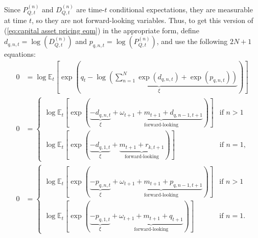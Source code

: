 \documentclass[12 pt, oneside]{article}
\theoremstyle{definition}
\theoremstyle{definition}
\theoremstyle{definition}
\newcommand{\E}{\mathbb{E}}
\begin{document}
Since $P_{Q, t}^{(n)}$ and $D_{Q, t}^{(n)}$ are time-$t$ conditional expectations, they are measurable at time $t$, so they are not forward-looking variables. Thus, to get this version of (\ref{eq:capital asset pricing eqm}) in the appropriate form, define $d_{q, n, t} = \log(D_{Q, t}^{(n)})$ and $p_{q, n, t} = \log(P_{Q, t}^{(n)})$, and use the following $2N + 1$ equations:
\begin{align}
  0 & = \log\E_t\left[\exp\left(\underbrace{q_t - \log\left(\sum_{n = 1}^{N}\exp(d_{q, n, t}) + \exp(p_{q, n, t})\right)}_{\xi}\right)\right]\\
  0 & =
      \begin{cases}
        \log\E_t\left[\exp\left(\underbrace{-d_{q, n, t}}_{\xi} + \underbrace{\omega_{t + 1} + m_{t + 1} + d_{q, n - 1, t + 1}}_{\text{forward-looking}}\right)\right] & \text{if } n > 1\\
        \log\E_t\left[\exp\left(\underbrace{- d_{q, 1, t}}_{\xi} + \underbrace{m_{t + 1} + r_{k, t + 1}}_{\text{forward-looking}} \right)\right] & \text{if } n = 1,
      \end{cases}\\
  0 & =
      \begin{cases}
        \log\E_t\left[\exp\left(\underbrace{-p_{q, n, t}}_{\xi} + \underbrace{\omega_{t + 1} + m_{t + 1} + p_{q, n - 1, t + 1}}_{\text{forward-looking}} \right)\right] & \text{if } n > 1\\
        \log\E_t\left[\exp\left(\underbrace{-p_{q, 1, t}}_{\xi} + \underbrace{\omega_{t + 1} + m_{t + 1} + q_{t + 1}}_{\text{forward-looking}}\right)\right] & \text{if }n = 1.
      \end{cases}
\end{align}
\end{document}
